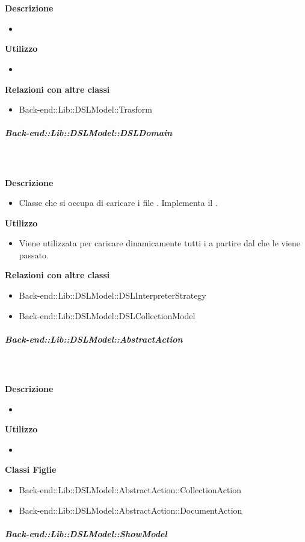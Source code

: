         \textbf{\\ \\ Descrizione} 
          \begin{itemize}
            \item[] 
          \end{itemize}      
        \textbf{Utilizzo}  
          \begin{itemize}
            \item[] 
          \end{itemize}
          \textbf{Relazioni con altre classi}
          \begin{itemize}
              \item{Back-end::Lib::DSLModel::Trasform}
          \end{itemize}
      \subparagraph{Back-end::Lib::DSLModel::DSLDomain}
        
        \textbf{\\ \\ Descrizione} 
          \begin{itemize}
            \item[] Classe che si occupa di caricare i file . Implementa il  .
          \end{itemize}      
        \textbf{Utilizzo}  
          \begin{itemize}
            \item[] Viene utilizzata per caricare dinamicamente tutti i  a partire dal  che le viene passato.
          \end{itemize}
          \textbf{Relazioni con altre classi}
          \begin{itemize}
              \item{Back-end::Lib::DSLModel::DSLInterpreterStrategy}
              \item{Back-end::Lib::DSLModel::DSLCollectionModel}
          \end{itemize}
      \subparagraph{Back-end::Lib::DSLModel::AbstractAction}
        
        \textbf{\\ \\ Descrizione} 
          \begin{itemize}
            \item[] 
          \end{itemize}      
        \textbf{Utilizzo}  
          \begin{itemize}
            \item[] 
          \end{itemize}
          \textbf{Classi Figlie}
          \begin{itemize}
              \item{Back-end::Lib::DSLModel::AbstractAction::CollectionAction}
              \item{Back-end::Lib::DSLModel::AbstractAction::DocumentAction}
          \end{itemize}
      \subparagraph{Back-end::Lib::DSLModel::ShowModel}
        
